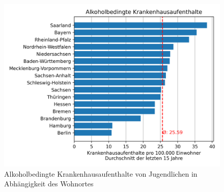 \documentclass{article}
\begin{document}
\begin{figure}[H]
    \centering
    \includegraphics[scale=.7]{"assets/Alkohol_Wohnort_avg_15_Jahre.png"}
    \caption{Alkoholbedingte Krankenhausaufenthalte von Jugendlichen in Abhängigkeit des Wohnortes}
    \label{fig:Krankenhausaufenthalte_2}
\end{figure}
\end{document}
